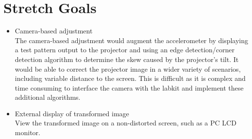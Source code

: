 \documentclass{article}
\begin{document}
\section{Stretch Goals}
	\begin{itemize}
		\item Camera-based adjustment \hfill \\
			The camera-based adjustment would augment the accelerometer by displaying a test pattern output to the projector and using an edge detection/corner detection algorithm to determine the skew caused by the projector's tilt. It would be able to correct the projector image in a wider variety of scenarios, including variable distance to the screen. This is difficult as it is complex and time consuming to interface the camera with the labkit and implement these additional algorithms.
		\item External display of transformed image\hfill \\
			View the transformed image on a non-distorted screen, such as a PC LCD monitor.
	\end{itemize}
\end{document}
